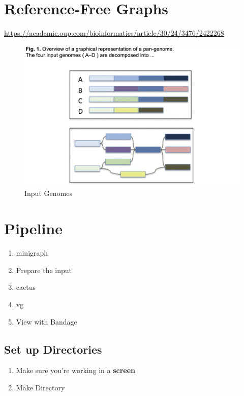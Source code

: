 \documentclass[
]{book}
\providecommand{\tightlist}{%
  \setlength{\itemsep}{0pt}\setlength{\parskip}{0pt}}
\begin{document}
\hypertarget{reference-free-graphs}{%
\section{Reference-Free Graphs}\label{reference-free-graphs}}

\url{https://academic.oup.com/bioinformatics/article/30/24/3476/2422268}

\begin{figure}
\centering
\includegraphics[width=1\textwidth,height=\textheight]{./Figures/InputGenomes.png}
\caption{Input Genomes}
\end{figure}

\hypertarget{pipeline-2}{%
\section{Pipeline}\label{pipeline-2}}

\begin{enumerate}
\def\labelenumi{\arabic{enumi}.}
\tightlist
\item
  minigraph
\item
  Prepare the input
\item
  cactus
\item
  vg
\item
  View with Bandage
\end{enumerate}

\hypertarget{set-up-directories-1}{%
\subsection{Set up Directories}\label{set-up-directories-1}}

\begin{enumerate}
\def\labelenumi{\arabic{enumi}.}
\item
  Make sure you're working in a \textbf{screen}
\item
  Make Directory
\end{enumerate}
\end{document}
